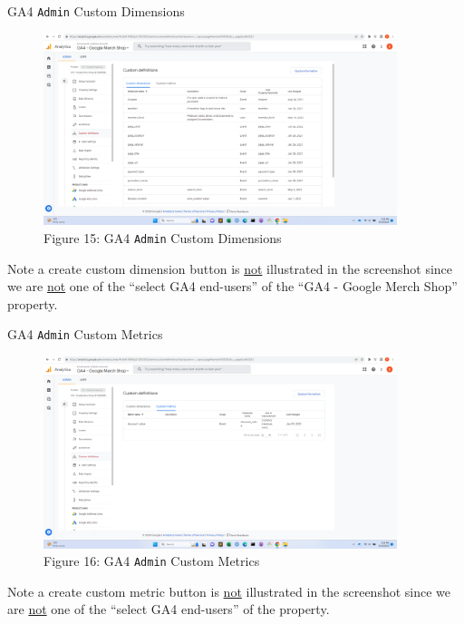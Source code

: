 \documentclass[pdf]{beamer}
\theoremstyle{remark}
\theoremstyle{definition}
\begin{document}
\begin{frame}[t]{GA4 \texttt{Admin} Custom Dimensions}
\begin{figure}[htbp]
  \captionsetup{justification=centering}
  \includegraphics[height=5.6cm, trim=1.5cm 0.0cm 2.0cm 0.0cm width=5.6cm]{Images/G4A_7b_091923_Admin_Customdefinitions_Customdimensions.png}
  \caption{Figure {\color{franklinblue} 15}: GA4 \texttt{Admin} Custom Dimensions}
\end{figure}
\vspace{-2.0ex}
\small
Note a {\color{blue} create custom dimension} button is \underline{not} illustrated in the screenshot since we are \underline{not} one of the ``select GA4 end-users'' of the ``GA4 - Google Merch Shop'' property. 
\end{frame}

\begin{frame}[t]{GA4 \texttt{Admin} Custom Metrics}
\begin{figure}[htbp]
  \captionsetup{justification=centering}
  \includegraphics[height=5.6cm, trim=1.5cm 0.0cm 2.0cm 0.0cm width=5.6cm]{Images/G4A_7c_091923_Admin_Customdefinitions_Custommetrics.png}
  \caption{Figure {\color{franklinblue} 16}: GA4 \texttt{Admin} Custom Metrics}
\end{figure}
\vspace{-2.0ex}
\small
Note a  {\color{blue} create custom metric} button is \underline{not} illustrated in the screenshot since we are \underline{not} one of the ``select GA4 end-users'' of the property. 
\end{frame}
\end{document}
